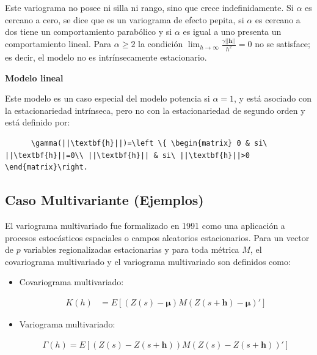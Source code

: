 \documentclass[
]{book}
\begin{document}
Este variograma no posee ni silla ni rango, sino que crece indefinidamente. Si \(\alpha\) es cercano a cero, se dice que es un variograma de efecto pepita, si \(\alpha\) es cercano a dos tiene un comportamiento parabólico y si \(\alpha\) es igual a uno presenta un comportamiento lineal. Para \(\alpha\geq 2\) la condición \(\lim_{h\to \infty}\frac{\gamma||\textbf{h}||}{h^2}=0\) no se satisface; es decir, el modelo no es intrínsecamente estacionario.

\textbf{Modelo lineal}

Este modelo es un caso especial del modelo potencia si \(\alpha=1\), y está asociado con la estacionariedad intrínseca, pero no con la estacionariedad de segundo orden y está definido por:

\begin{verbatim}
      \gamma(||\textbf{h}||)=\left \{ \begin{matrix} 0 & si\ ||\textbf{h}||=0\\ ||\textbf{h}|| & si\ ||\textbf{h}||>0 \end{matrix}\right.  
\end{verbatim}

\hypertarget{caso-multivariante-ejemplos}{%
\subsection{Caso Multivariante (Ejemplos)}\label{caso-multivariante-ejemplos}}

El variograma multivariado fue formalizado en 1991 como una aplicación a procesos estocásticos espaciales o campos aleatorios estacionarios. Para un vector de \(p\) variables regionalizadas estacionarias y para toda métrica \(M\), el covariograma multivariado y el variograma multivariado son definidos como:

\begin{itemize}
\item
  Covariograma multivariado:

  \begin{align}
        K(h)&=E[(Z(s)-\boldsymbol \mu)M(Z(s+\textbf{h})-\boldsymbol \mu){'}]
    \end{align}
\item
  Variograma multivariado:

  \begin{align}
        \Gamma(h)=E[(Z(s)-Z(s+\textbf{h}))M(Z(s)-Z(s+\textbf{h}))']
    \end{align}
\end{itemize}
\end{document}
